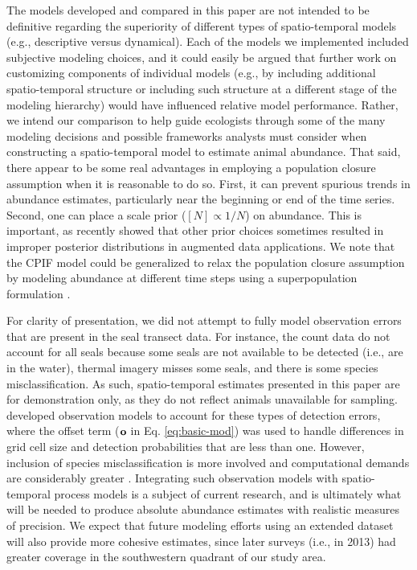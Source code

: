 \documentclass[12pt,english]{article}
\begin{document}
\begin{spacing}{1.9}
The models developed and compared in this paper are not intended to be definitive regarding the superiority
of different types of spatio-temporal models (e.g., descriptive versus dynamical).  Each of the models we implemented included subjective modeling choices, and it could easily be argued that further work on customizing components of individual models (e.g., by including additional spatio-temporal structure or including such structure at a different stage of the modeling hierarchy) would have influenced relative model performance.  Rather, we intend our comparison to help guide ecologists through some of the many modeling decisions and possible frameworks analysts must consider when constructing a spatio-temporal model to estimate animal abundance.  That said, there appear to be some real advantages in employing a population closure assumption when it is reasonable to do so.  First, it can prevent spurious trends in abundance estimates, particularly near the beginning or end of the time series.  Second, one can place a scale prior ($[N] \propto 1/N$) on abundance.  This is important, as \citet{Link2013} recently showed that other prior choices sometimes resulted in improper posterior distributions in augmented data applications.  We note that the CPIF model could be generalized to relax the population closure assumption by modeling abundance at different time steps using a superpopulation formulation \citep[as with the Schwarz-Arnason parameterization of the Jolly-Seber model; cf.][]{SchwarzArnason1996}.

For clarity of presentation, we did not attempt to fully model observation errors that are present in the seal transect data.  For instance, the count data do not account for all seals because some seals are not available to be detected (i.e., are in the water), thermal imagery misses some seals, and there is some species misclassification. As such, spatio-temporal estimates presented in this paper are for demonstration only, as they do not reflect animals unavailable for sampling. \citet{ConnEtAl2014} developed observation models to account for these types of detection errors, where the offset term (${\bf o}$ in Eq. \ref{eq:basic-mod}) was used to handle differences in grid cell size and detection probabilities that are less than one.  However, inclusion of species misclassification is more involved and computational demands are considerably greater \citep{Conn2013}.  Integrating such observation models with spatio-temporal process models is a subject of current research, and is ultimately what will be needed to produce absolute abundance estimates with realistic measures of precision.  We expect that future modeling efforts using an extended dataset will also provide more cohesive estimates, since later surveys (i.e., in 2013) had greater coverage in the southwestern quadrant of our study area.


\end{spacing}
\end{document}
